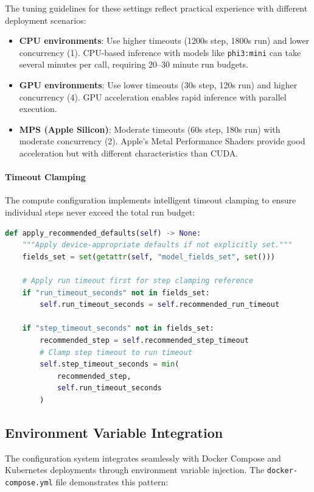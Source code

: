 The tuning guidelines for these settings reflect practical experience with different deployment scenarios:
\begin{itemize}
    \item \textbf{CPU environments}: Use higher timeouts (1200s step, 1800s run) and lower concurrency (1). CPU-based inference with models like \texttt{phi3:mini} can take several minutes per call, requiring 20--30 minute run budgets.
    \item \textbf{GPU environments}: Use lower timeouts (30s step, 120s run) and higher concurrency (4). GPU acceleration enables rapid inference with parallel execution.
    \item \textbf{MPS (Apple Silicon)}: Moderate timeouts (60s step, 180s run) with moderate concurrency (2). Apple's Metal Performance Shaders provide good acceleration but with different characteristics than CUDA.
\end{itemize}

\paragraph{Timeout Clamping}
The compute configuration implements intelligent timeout clamping to ensure individual steps never exceed the total run budget:

\begin{lstlisting}[language=Python, caption=Timeout clamping logic in apply\_recommended\_defaults]
def apply_recommended_defaults(self) -> None:
    """Apply device-appropriate defaults if not explicitly set."""
    fields_set = set(getattr(self, "model_fields_set", set()))
    
    # Apply run timeout first for step clamping reference
    if "run_timeout_seconds" not in fields_set:
        self.run_timeout_seconds = self.recommended_run_timeout
    
    if "step_timeout_seconds" not in fields_set:
        recommended_step = self.recommended_step_timeout
        # Clamp step timeout to run timeout
        self.step_timeout_seconds = min(
            recommended_step, 
            self.run_timeout_seconds
        )
\end{lstlisting}

\subsection{Environment Variable Integration}

The configuration system integrates seamlessly with Docker Compose and Kubernetes deployments through environment variable injection. The \texttt{docker-compose.yml} file demonstrates this pattern:

